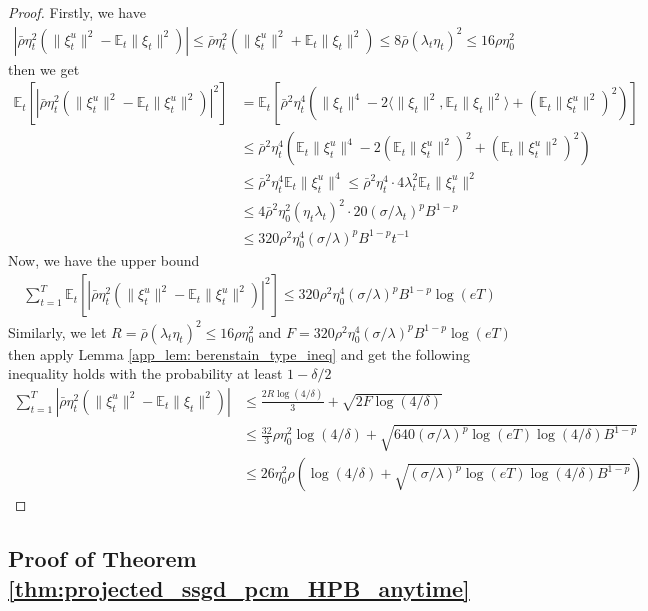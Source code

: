 \documentclass{article}
\def \E {\mathbb{E}}
\def \brho {\bar{\rho}}
\def \sumT {\sum_{t=1}^T}
\begin{document}
\begin{proof}
    Firstly, we have
    \begin{align}
        \left|\brho\eta_t^2(\|\xi_t^u\|^2-\E_t\|\xi_t\|^2)\right|\leq \brho\eta_t^2(\|\xi_t^u\|^2+\E_t\|\xi_t\|^2)\leq 8\brho(\lambda_t\eta_t)^2\leq 16\rho\eta_0^2
    \end{align}
    then we get 
    \begin{align}
    \E_t\left[\left|\brho\eta_t^2(\|\xi_t^u\|^2-\E_t\|\xi_t^u\|^2)\right|^2\right] &= \E_t\left[\brho^2\eta_t^4\left(\|\xi_t\|^4-2\langle \|\xi_t\|^2,\E_t\|\xi_t\|^2\rangle+(\E_t\|\xi_t^u\|^2)^2\right)\right]\nonumber\\
    &\leq \brho^2\eta_t^4\left(\E_t\|\xi_t^u\|^4-2(\E_t\|\xi_t^u\|^2)^2+(\E_t\|\xi_t^u\|^2)^2\right)\nonumber\\
    &\leq \brho^2\eta_t^4\E_t\|\xi_t^u\|^4\leq \brho^2\eta_t^4\cdot4\lambda_t^2 \E_t\|\xi_t^u\|^2\nonumber\\
    &\leq 4\brho^2 \eta_0^2 (\eta_t\lambda_t)^2\cdot 20(\sigma/\lambda_t)^pB^{1-p}\nonumber\\
    &\leq 320\rho^2\eta_0^4(\sigma/\lambda)^pB^{1-p}t^{-1}
    \end{align}
    Now, we have the upper bound
    \begin{align}
        \sum_{t=1}^T \E_t\left[\left|\brho\eta_t^2(\|\xi_t^u\|^2-\E_t\|\xi_t^u\|^2)\right|^2\right]\leq 320\rho^2\eta_0^4(\sigma/\lambda)^pB^{1-p}\log(eT)
    \end{align}
    Similarly, we let $R = \brho(\lambda_t\eta_t)^2\leq 16\rho\eta_0^2$ and $F = 320\rho^2\eta_0^4(\sigma/\lambda)^pB^{1-p}\log(eT)$ then apply Lemma \ref{app_lem: berenstain_type_ineq} and get the following inequality holds with the probability at least $1-\delta/2$
    \begin{align}
        \sumT \left|\brho\eta_t^2(\|\xi_t^u\|^2-\E_t\|\xi_t\|^2)\right| &\leq \frac{2R\log(4/\delta)}{3} + \sqrt{2F\log(4/\delta)}\nonumber\\
        &\leq \frac{32}{3}\rho\eta_0^2\log(4/\delta) + \sqrt{640(\sigma/\lambda)^p\log(eT)\log(4/\delta)B^{1-p}}\nonumber\\
        &\leq 26\eta_0^2\rho\left(\log(4/\delta) + \sqrt{(\sigma/\lambda)^p\log(eT)\log(4/\delta)B^{1-p}}\right)
    \end{align}
\end{proof}

\subsection{Proof of Theorem \ref{thm:projected_ssgd_pcm_HPB_anytime}}
\end{document}
